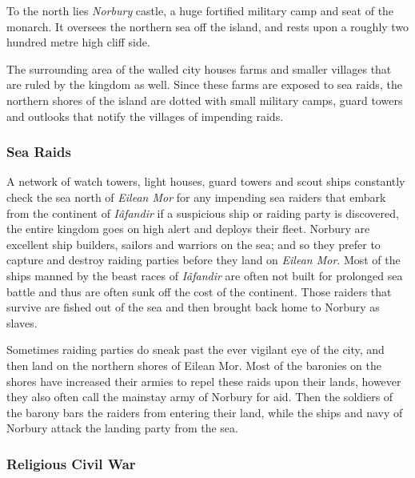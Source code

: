 To the north lies \emph{Norbury} castle, a huge fortified military camp and
seat of the monarch. It oversees the northern sea off the island, and rests
upon a roughly two hundred metre high cliff side.

The surrounding area of the walled city houses farms and smaller villages that
are ruled by the kingdom as well. Since these farms are exposed to sea raids,
the northern shores of the island are dotted with small military camps, guard
towers and outlooks that notify the villages of impending raids.

\subsubsection*{Sea Raids}

A network of watch towers, light houses, guard towers and scout ships
constantly check the sea north of \emph{Eilean Mor} for any impending sea
raiders that embark from the continent of \emph{Iâfandir} if a suspicious
ship or raiding party is discovered, the entire kingdom goes on high alert and
deploys their fleet. Norbury are excellent ship builders, sailors and warriors
on the sea; and so they prefer to capture and destroy raiding parties before
they land on \emph{Eilean Mor}. Most of the ships manned by the beast races of
\emph{Iâfandir} are often not built for prolonged sea battle and thus are
often sunk off the cost of the continent. Those raiders that survive are
fished out of the sea and then brought back home to Norbury as slaves.

Sometimes raiding parties do sneak past the ever vigilant eye of the city,
and then land on the northern shores of Eilean Mor. Most of the baronies
on the shores have increased their armies to repel these raids upon their
lands, however they also often call the mainstay army of Norbury for aid.
Then the soldiers of the barony bars the raiders from entering their land,
while the ships and navy of Norbury attack the landing party from the sea.

\subsubsection*{Religious Civil War}

